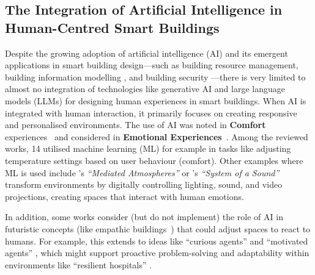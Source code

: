 \subsection{The Integration of Artificial Intelligence in Human-Centred Smart Buildings}
Despite the growing adoption of artificial intelligence (AI) and its emergent applications in smart building design---such as building resource management, building information modelling \cite{coupry2021bim}, and building security \cite{genkin2023b}---there is very limited to almost no integration of technologies like generative AI and large language models (LLMs) for designing human experiences in smart buildings. When AI is integrated with human interaction, it primarily focuses on creating responsive and personalised environments. The use of AI was noted in \textbf{Comfort} experiences~\cite{yang2014making, zhao2017mediated} and considered in \textbf{Emotional Experiences}~\cite{rao2023towards}. Among the reviewed works, 14 utilised machine learning (ML) for example in tasks like adjusting temperature settings based on user behaviour \cite{yang2014making} (comfort). Other examples where ML is used include \citet{zhao2017mediated}'s \textit{``Mediated Atmospheres''} or \citet{andres2023human}'s \textit{``System of a Sound''} transform environments by digitally controlling lighting, sound, and video projections, creating spaces that interact with human emotions.

In addition, some works consider (but do not implement) the role of AI in futuristic concepts (like empathic buildings~\cite{rao2023towards}) that could adjust spaces to react to humans. For example, this extends to ideas like ``curious agents'' and ``motivated agents'' \cite{merrick2007curious}, which might support proactive problem-solving and adaptability within environments like ``resilient hospitals''  \cite{taylor2022hospitals}.


